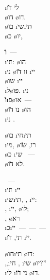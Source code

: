  \i{לי} \u{דו}\\
\o{דו} \o{דו}.\\
\o{בו} \i{שי}\i{תי}\\
\o{כ} \o{יו},

\u{ו}~—\\
\i{תי}: \o{הו}\\
\i{ני} \o{זו} \u{דו} \i{יי}\\
\o{שו}\gnuva {}  \i{יי}\\
\i{ל}\o{פו}. \i{ני} \\
\u{ו}\i{פ}\o{או}~—\\
\o{נו} \u{דו}  \o{הו}\\
\i{ני} .

\o{בו} \i{חי}\i{תי} \\
\i{מי}, \o{רו}, \u{שו}\\
 \o{כ} \i{שי}\gnuva {} ~—\\
\o{לא}  \u{דו}.

~—\\
\i{תי} \i{יי}\\
\i{שי}\i{תי}, , \i{יי}:\\
, \i{יי}, \o{לו};\\
,  \o{רא}\\
\i{כ}\i{יי}~—~—~—\\
\i{תי},  \u{דו} \i{יי}.

 \o{חו}\i{תי} \o{דו}:\\
„\i{חי} ,  \i{שי} \o{יו}?”\\
 \i{לי} \i{ני} \u{דו} \o{דו}.
